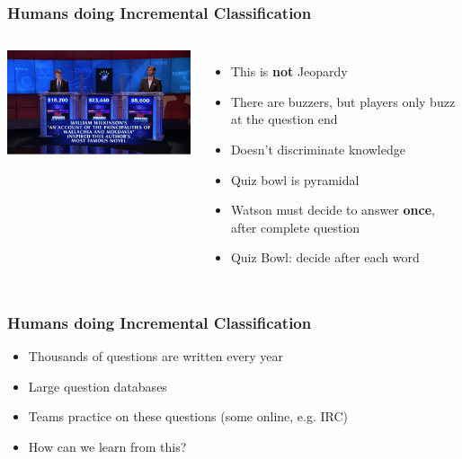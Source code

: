 \documentclass[compress]{beamer}
\begin{document}
\begin{frame}
	\frametitle{Humans doing Incremental Classification}

	\begin{columns}

		\includegraphics[width=1.0\linewidth]{qb/jeopardy}


		\begin{itemize}
			\item This is {\bf not} Jeopardy \cite{ferruci-10}
			\item There are buzzers, but players only buzz
                          at the question end
			\item Doesn't discriminate knowledge
			\item Quiz bowl is pyramidal
                        \item Watson must decide to answer {\bf once}, after
                          complete question
                        \item Quiz Bowl: decide after each word
		\end{itemize}

	\end{columns}

\end{frame}



\begin{frame}
	\frametitle{Humans doing Incremental Classification}

	\begin{itemize}
		\item Thousands of questions are written every year
		\item Large question databases
		\item Teams practice on these questions (some online, e.g. IRC)
		\item How can we learn from this?
	\end{itemize}

\end{frame}
\end{document}
